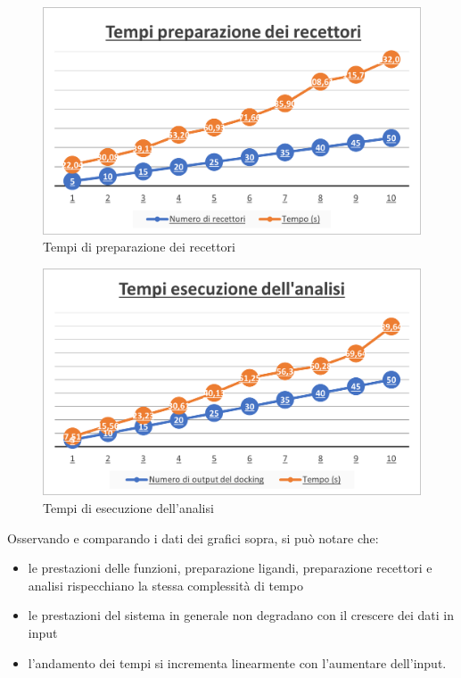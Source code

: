 \begin{figure}[H]
    \centering
    \includegraphics{immagini/capitolo4/tempiRecettori.png}
    \caption{Tempi di preparazione dei recettori}
    \label{fig:tempi recettori}
\end{figure}

\begin{figure}[H]
    \centering
    \includegraphics{immagini/capitolo4/tempiAnalisi.png}
    \caption{Tempi di esecuzione dell'analisi}
    \label{fig:tempi analisi}
\end{figure}

Osservando e comparando i dati dei grafici sopra, si può notare che:

\begin{itemize}
    \item le prestazioni delle funzioni, preparazione ligandi, preparazione recettori e analisi rispecchiano la stessa complessità di tempo
    \item le prestazioni del sistema in generale non degradano con il crescere dei dati in input
    \item l'andamento dei tempi si incrementa linearmente con l'aumentare dell'input.
\end{itemize}